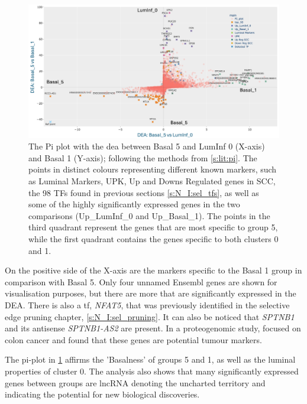 \begin{figure}
    \centering
    \includegraphics[width=1.0\textwidth,height=1.0\textheight,keepaspectratio]{Sections/Network_II/resources/reward/PI_Basal_5.png}
    \caption[Pi plot highlighting the properties for Basal 5]{The Pi plot with the \acrshort{dea} between Basal 5 and LumInf 0 (X-axis) and Basal 1 (Y-axis); following the methods from \cref{s:lit:pi}. The points in distinct colours representing different known markers, such as Luminal Markers, UPK, Up and Downs Regulated genes in \gls{SCC}, the 98 TFs found in previous sections \cref{s:N_I:sel_tfs}, as well as some of the highly significantly expressed genes in the two comparisons (Up\_LumInf\_0 and Up\_Basal\_1). The points in the third quadrant represent the genes that are most specific to group 5, while the first quadrant contains the genes specific to both clusters 0 and 1.}
    \label{fig:N_II:pi_basal_5}
\end{figure}


On the positive side of the X-axis are the markers specific to the Basal 1 group in comparison with Basal 5. Only four unnamed Ensembl genes are shown for visualisation purposes, but there are more that are significantly expressed in the DEA. There is also a \acrlong{tf}, \textit{NFAT5}, that was previously identified in the selective edge pruning chapter, \cref{s:N_I:sel_pruning}. It can also be noticed that \textit{SPTNB1} and its antisense \textit{SPTNB1-AS2} are present. In a proteogenomic study, \citep{Fanayan2013-uj} focused on colon cancer and found that these genes are potential tumour markers.

The pi-plot in \cref{fig:N_II:pi_basal_5} affirms the 'Basalness' of groups 5 and 1, as well as the luminal properties of cluster 0. The analysis also shows that many significantly expressed genes between groups are \acrlong{lncRNA} denoting the uncharted territory and indicating the potential for new biological discoveries.



